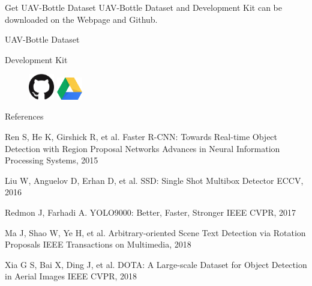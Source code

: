 \documentclass[newPxFont, fullfooter, sectionpages, progressbar, displaynote]{beamer}
\begin{document}
\begin{frame}[c]{Get UAV-Bottle Dataset}
	\vspace{10mm}
	UAV-Bottle Dataset and Development Kit can be downloaded on the Webpage and Github. \\
\vspace{1em}
\begin{center}
	\large{UAV-Bottle Dataset}

	\large{Development Kit}
	\vspace{1.5em}

	\begin{figure}
		\centerline{
			\includegraphics[width=0.1\textwidth]{images/GitHub-Mark-120px-plus.png}
			\hspace{1.5cm}
			\includegraphics[width=0.1\textwidth]{images/Google_Drive_Logo.png}
			}
	\end{figure}
	
\end{center}
\end{frame}



\begin{frame}{References}
	\begin{thebibliography}{10}
	\scriptsize
	
	
	\beamertemplatearticlebibitems
	Ren S, He K, Girshick R, et al.
	\newblock Faster R-CNN: Towards Real-time Object Detection with Region Proposal Networks
	\newblock Advances in Neural Information Processing Systems, 2015
	
	\beamertemplatearticlebibitems
	Liu W, Anguelov D, Erhan D, et al.
	\newblock SSD: Single Shot Multibox Detector
	\newblock ECCV, 2016
	
	\beamertemplatearticlebibitems
	Redmon J, Farhadi A.
	\newblock YOLO9000: Better, Faster, Stronger
	\newblock IEEE CVPR, 2017

	\beamertemplatearticlebibitems
	Ma J, Shao W, Ye H, et al.
	\newblock Arbitrary-oriented Scene Text Detection via Rotation Proposals
	\newblock IEEE Transactions on Multimedia, 2018
	

	\beamertemplatearticlebibitems
	Xia G S, Bai X, Ding J, et al.
	\newblock DOTA: A Large-scale Dataset for Object Detection in Aerial Images
	\newblock IEEE CVPR, 2018
	
	
  \end{thebibliography}
\end{frame}
\end{document}
